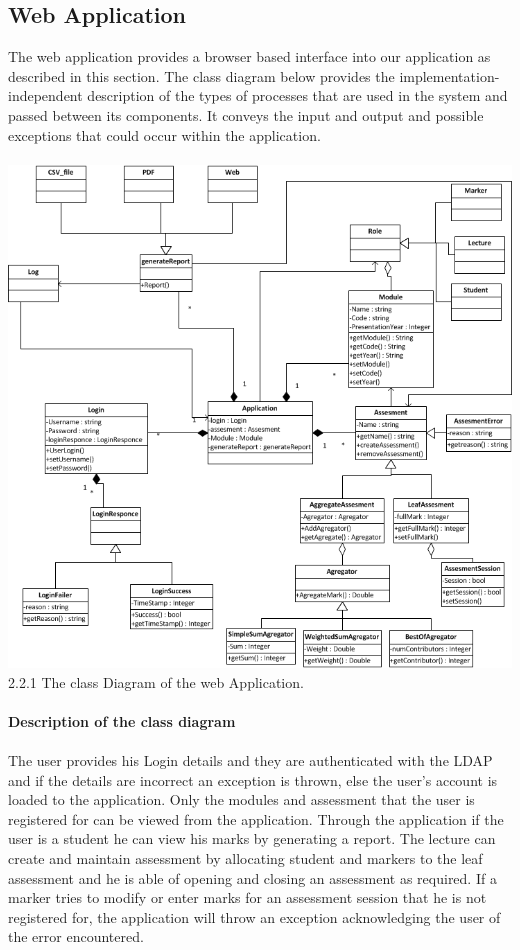 \documentclass[12pt,a4paper]{article}
\begin{document}
\subsection{Web Application}
The web application provides a browser based interface into our application as described in this section. The class diagram below provides the implementation-independent description of the types of processes that are used in the system and passed between its components. It conveys the input and output and possible exceptions that could occur within the application.\\\\
\includegraphics[scale = 0.75]{class_diagram.png}\\
2.2.1 The class Diagram of the web Application.\\\\
\textbf{Description of the class diagram}\\\\
The user provides his Login details and they are authenticated with the LDAP and if the details are incorrect an exception is thrown, else the user’s account is loaded to the application. Only the modules and assessment that the user is registered for can be viewed from the application. Through the application if the user is a student he can view his marks by generating a report. The lecture can create and maintain assessment by allocating student and markers to the leaf assessment and he is able of opening and closing an assessment as required. If a marker tries to modify or enter marks for an assessment session that he is not registered for, the application will throw an exception acknowledging the user of the error encountered.\\\\
\end{document}
